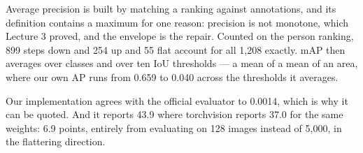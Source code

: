 \documentclass[11pt,a4paper]{article}
\begin{document}
Average precision is built by matching a ranking against annotations, and its
definition contains a maximum for one reason: precision is not monotone, which
Lecture 3 proved, and the envelope is the repair. Counted on the person
ranking, 899 steps down and 254 up and 55 flat account for all 1{,}208 exactly.
mAP then averages over classes and over ten IoU thresholds --- a mean of a mean
of an area, where our own AP runs from 0.659 to 0.040 across the thresholds it
averages.

Our implementation agrees with the official evaluator to 0.0014, which is why
it can be quoted. And it reports 43.9 where torchvision reports 37.0 for the
same weights: 6.9 points, entirely from evaluating on 128 images instead of
5{,}000, in the flattering direction.
\end{document}

